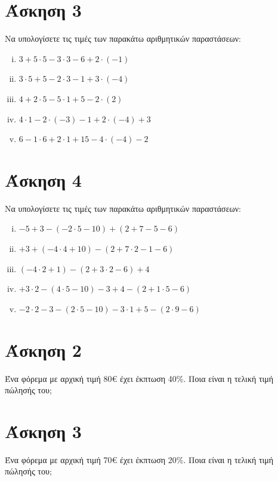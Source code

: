 \documentclass[a4paper,10pt]{report}
\begin{document}
\section*{Άσκηση 3  \hfill \small{}}
Να υπολογίσετε τις τιμές των παρακάτω αριθμητικών παραστάσεων:
\begin{enumerate}[i)]
\item $3+5\cdot 5-3\cdot 3-6+2\cdot(-1)$
\item $3\cdot 5+5-2\cdot 3-1+3\cdot(-4)$
\item $4+2\cdot 5-5\cdot 1+5-2\cdot(2)$
\item $4\cdot 1-2\cdot (-3)-1+2\cdot(-4)+3$
\item $6-1\cdot 6+2\cdot 1+15-4\cdot(-4)-2$
\end{enumerate}

\section*{Άσκηση 4  \hfill \small{}}
Να υπολογίσετε τις τιμές των παρακάτω αριθμητικών παραστάσεων:
\begin{enumerate}[i)]
\item $−5+3−(−2\cdot5−10)+(2+7−5−6) $
\item $+3+(−4\cdot4+10)-(2+7\cdot2−1−6) $
\item $(−4\cdot2+1)-(2+3\cdot2−6)+4 $
\item $+3\cdot2-(4\cdot5-10)-3+4-(2+1\cdot5−6) $
\item $-2\cdot2-3-(2\cdot5-10)-3\cdot1+5-(2\cdot9−6) $
\end{enumerate}

\newpage

\section*{Άσκηση 2  \hfill \small{}}
Ένα φόρεμα με αρχική τιμή 80€ έχει έκπτωση 40\%. Ποια είναι η τελική τιμή πώλησής του;

\section*{Άσκηση 3  \hfill \small{}}
Ένα φόρεμα με αρχική τιμή 70€ έχει έκπτωση 20\%. Ποια είναι η τελική τιμή πώλησής του;
\end{document}
